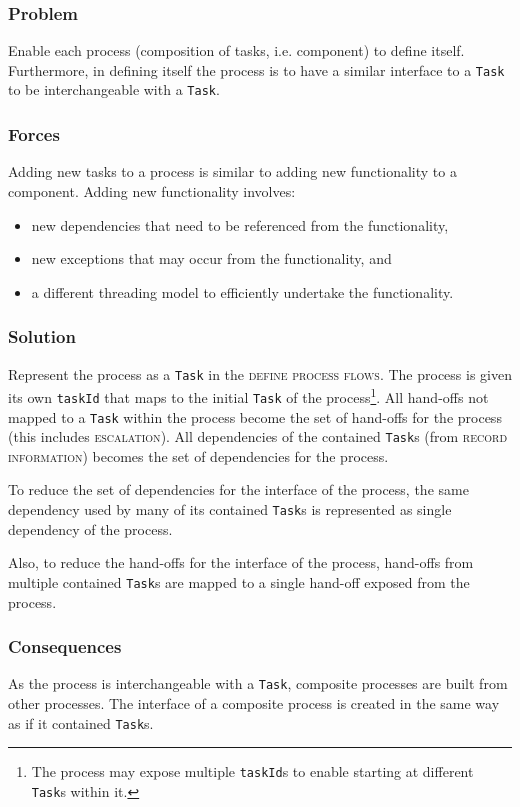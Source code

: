 \documentclass[prodmode]{style/acmlarge}
\begin{document}
\subsubsection*{Problem} Enable each process (composition of tasks, i.e.
component) to define itself.  Furthermore, in defining itself the process is to
have a similar interface to a \texttt{Task} to be interchangeable with a
\texttt{Task}.

\subsubsection*{Forces} Adding new tasks to a process is similar to adding new
functionality to a component.  Adding new functionality involves:
\begin{itemize}
  \item new dependencies that need to be referenced from the functionality,
  \item new exceptions that may occur from the functionality, and
  \item a different threading model to efficiently undertake the functionality. 
\end{itemize}

\subsubsection*{Solution} Represent the process as a \texttt{Task} in the
\textsc{define process flows}.  The process is given its own \texttt{taskId}
that maps to the initial \texttt{Task} of the process\footnote{The process may
expose multiple \texttt{taskId}s to enable starting at different \texttt{Task}s
within it.}.  All hand-offs not mapped to a \texttt{Task} within the process
become the set of hand-offs for the process (this includes \textsc{escalation}).
All dependencies of the contained \texttt{Task}s (from \textsc{record
information}) becomes the set of dependencies for the process.

To reduce the set of dependencies for the interface of the process, the same
dependency used by many of its contained \texttt{Task}s is represented as single
dependency of the process.

Also, to reduce the hand-offs for the interface of the process, hand-offs
from multiple contained \texttt{Task}s are mapped to a single hand-off exposed
from the process.

\subsubsection*{Consequences} As the process is interchangeable with a
\texttt{Task}, composite processes are built from other processes.  The
interface of a composite process is created in the same way as if it contained
\texttt{Task}s.
\end{document}
